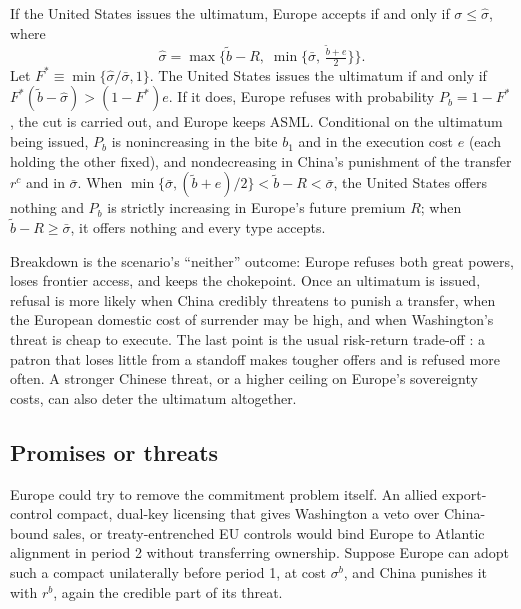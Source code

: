 \begin{proposition}[Breakdown]\label{prop:breakdown}
If the United States issues the ultimatum, Europe accepts if and only if $\sigma \leq \hat\sigma$, where
\begin{equation}\label{eq:sstar}
\hat\sigma = \max\Big\{\tilde b - R,\; \min\big\{\bar\sigma,\, \tfrac{\tilde b+e}{2}\big\}\Big\}.
\end{equation}
Let $F^* \equiv \min\{\hat\sigma/\bar\sigma, 1\}$. The United States issues the ultimatum if and only if $F^*(\tilde b - \hat\sigma) > (1-F^*)e$. If it does, Europe refuses with probability $P_b = 1 - F^*$, the cut is carried out, and Europe keeps ASML. Conditional on the ultimatum being issued, $P_b$ is nonincreasing in the bite $b_1$ and in the execution cost $e$ (each holding the other fixed), and nondecreasing in China's punishment of the transfer $r^c$ and in $\bar\sigma$. When $\min\{\bar\sigma, (\tilde b+e)/2\} < \tilde b - R < \bar\sigma$, the United States offers nothing and $P_b$ is strictly increasing in Europe's future premium $R$; when $\tilde b - R \geq \bar\sigma$, it offers nothing and every type accepts.
\end{proposition}

Breakdown is the scenario's ``neither'' outcome: Europe refuses both great powers, loses frontier access, and keeps the chokepoint. Once an ultimatum is issued, refusal is more likely when China credibly threatens to punish a transfer, when the European domestic cost of surrender may be high, and when Washington's threat is cheap to execute. The last point is the usual risk-return trade-off \citep{fearon1995rationalist, powell1999shadow}: a patron that loses little from a standoff makes tougher offers and is refused more often. A stronger Chinese threat, or a higher ceiling on Europe's sovereignty costs, can also deter the ultimatum altogether.

\subsection{Promises or threats}

Europe could try to remove the commitment problem itself. An allied export-control compact, dual-key licensing that gives Washington a veto over China-bound sales, or treaty-entrenched EU controls would bind Europe to Atlantic alignment in period 2 without transferring ownership. Suppose Europe can adopt such a compact unilaterally before period 1, at cost $\sigma^b$, and China punishes it with $r^b$, again the credible part of its threat.

